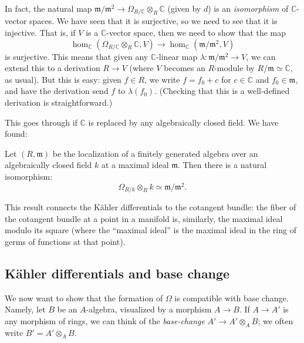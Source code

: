 In fact, the natural map $\mathfrak{m}/\mathfrak{m}^2 \to \Omega_{R/\mathbb{C}}
\otimes_R \mathbb{C}$ (given by $d$) is an \emph{isomorphism} of
$\mathbb{C}$-vector spaces. We have seen
that it is surjective, so we need to see that it is injective.
That is, if $V$ is a $\mathbb{C}$-vector space, then we need to show that the
map
\[ \hom_{\mathbb{C}}(\Omega_{R/\mathbb{C}}\otimes_R \mathbb{C}, V) \to
\hom_{\mathbb{C}}(\mathfrak{m}/\mathfrak{m}^2, V)   \]
is surjective. This means that given any $\mathbb{C}$-linear map
$\lambda: \mathfrak{m}/\mathfrak{m}^2 \to V$, we can extend this to a derivation $R \to
V$ (where $V$ becomes an $R$-module by $R/\mathfrak{m} \simeq \mathbb{C}$, as
usual).
But this is easy: given $f \in R$, we write $f = f_0 + c$ for $c \in
\mathbb{C}$ and $f_0 \in \mathfrak{m}$, and have the derivation send  $f$ to
$\lambda(f_0)$. 
(Checking that this is a well-defined derivation is straightforward.)

This goes through if $\mathbb{C}$ is replaced by any algebraically closed field.
We have found:
\begin{proposition} 
Let $(R, \mathfrak{m}) $ be the localization of a finitely generated algebra
over an algebraically closed field $k$ at a maximal ideal $\mathfrak{m}$.  Then
there is a natural isomorphism:
\[  \Omega_{R/k} \otimes_R k \simeq \mathfrak{m}/\mathfrak{m}^2. \]
\end{proposition} 

This result connects the K\"ahler differentials to the cotangent bundle: the
fiber of the cotangent bundle at a point in a manifold is, similarly, the maximal ideal
modulo its square (where the ``maximal ideal'' is the maximal ideal in the ring
of germs of functions at that point).
\subsection{K\"ahler differentials and base change}

We now want to show that the formation of $\Omega$ is compatible with base
change. Namely, let $B$ be an $A$-algebra, visualized by a morphism $ A \to B$.
If $A \to A'$ is any morphism of rings, we can think of the \emph{base-change}
$A' \to A' \otimes_A B$; we often write $B' =  A' \otimes_A B$.

